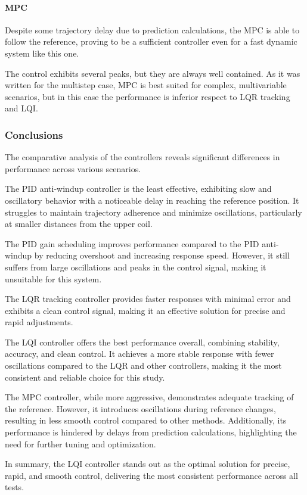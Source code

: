 \paragraph{MPC}

Despite some trajectory delay due to prediction calculations, the MPC is able to follow the reference, proving to be a sufficient controller even for a fast dynamic system like this one.

The control exhibits several peaks, but they are always well contained.
As it was written for the multistep case, MPC is best suited for complex, multivariable scenarios, but in this case the performance is inferior respect to LQR tracking and LQI.



\subsubsection{Conclusions}
\label{subsubsec:conclusions_controllers_comparison}

The comparative analysis of the controllers reveals significant differences in performance across various scenarios.

The PID anti-windup controller is the least effective, exhibiting slow and oscillatory behavior with a noticeable delay in reaching the reference position. It struggles to maintain trajectory adherence and minimize oscillations, particularly at smaller distances from the upper coil.

The PID gain scheduling improves performance compared to the PID anti-windup by reducing overshoot and increasing response speed. However, it still suffers from large oscillations and peaks in the control signal, making it unsuitable for this system.

The LQR tracking controller provides faster responses with minimal error and exhibits a clean control signal, making it an effective solution for precise and rapid adjustments.

The LQI controller offers the best performance overall, combining stability, accuracy, and clean control. It achieves a more stable response with fewer oscillations compared to the LQR and other controllers, making it the most consistent and reliable choice for this study.

The MPC controller, while more aggressive, demonstrates adequate tracking of the reference. However, it introduces oscillations during reference changes, resulting in less smooth control compared to other methods. Additionally, its performance is hindered by delays from prediction calculations, highlighting the need for further tuning and optimization.

In summary, the LQI controller stands out as the optimal solution for precise, rapid, and smooth control, delivering the most consistent performance across all tests.

